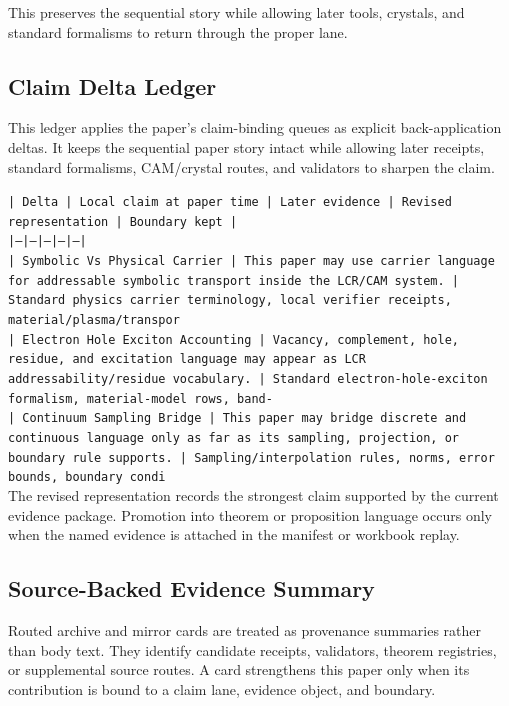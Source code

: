 \documentclass[11pt]{article}
\begin{document}
This preserves the sequential story while allowing later tools, crystals, and
standard formalisms to return through the proper lane.

\subsection*{Claim Delta Ledger}

This ledger applies the paper's claim-binding queues as explicit back-application
deltas. It keeps the sequential paper story intact while allowing later
receipts, standard formalisms, CAM/crystal routes, and validators to sharpen the
claim.

\noindent\texttt{| Delta | Local claim at paper time | Later evidence | Revised representation | Boundary kept |}\\
\noindent\texttt{|---|---|---|---|---|}\\
\noindent\texttt{| Symbolic Vs Physical Carrier | This paper may use carrier language for addressable symbolic transport inside the LCR/CAM system. | Standard physics carrier terminology, local verifier receipts, material/plasma/transpor}\\
\noindent\texttt{| Electron Hole Exciton Accounting | Vacancy, complement, hole, residue, and excitation language may appear as LCR addressability/residue vocabulary. | Standard electron-hole-exciton formalism, material-model rows, band-}\\
\noindent\texttt{| Continuum Sampling Bridge | This paper may bridge discrete and continuous language only as far as its sampling, projection, or boundary rule supports. | Sampling/interpolation rules, norms, error bounds, boundary condi}\\

The revised representation records the strongest claim supported by the current evidence package. Promotion into theorem or proposition language occurs only when the named evidence is attached in the manifest or workbook replay.

\subsection*{Source-Backed Evidence Summary}

Routed archive and mirror cards are treated as provenance summaries rather than
body text. They identify candidate receipts, validators, theorem registries, or
supplemental source routes. A card strengthens this paper only when its
contribution is bound to a claim lane, evidence object, and boundary.
\end{document}
